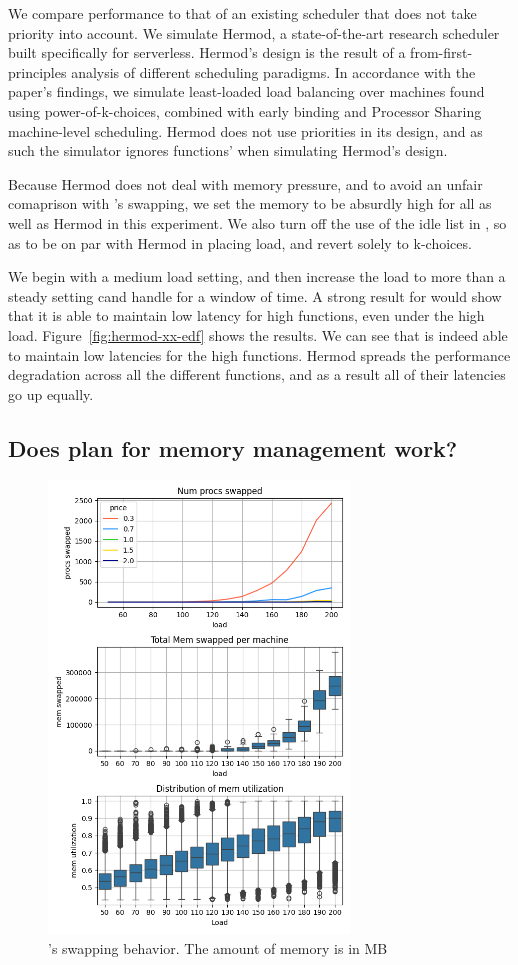 We compare \sys{} performance to that of an existing scheduler that does not
take priority into account. We simulate Hermod\cite{hermod}, a state-of-the-art
research scheduler built specifically for serverless. Hermod's design is the
result of a from-first-principles analysis of different scheduling paradigms. In
accordance with the paper's findings, we simulate least-loaded load balancing
over machines found using power-of-k-choices, combined with early binding and
Processor Sharing machine-level scheduling. Hermod does not use priorities in
its design, and as such the simulator ignores functions' \class{} when
simulating Hermod's design.

Because Hermod does not deal with memory pressure, and to avoid an unfair
comaprison with \sys{}'s swapping, we set the memory to be absurdly high for all
\sys{} as well as Hermod in this experiment. We also turn off the use of the
idle list in \sys{}, so as to be on par with Hermod in placing load, and revert
solely to k-choices.

We begin with a medium load setting, and then increase the load to more than a
steady setting cand handle for a window of time. A strong result for \sys{}
would show that it is able to maintain low latency for high \priceclass{}
functions, even under the high load. Figure~\ref{fig:hermod-xx-edf} shows the
results. We can see that \sys{} is indeed able to maintain low latencies for the
high \class{} functions. Hermod spreads the performance degradation across all
the different functions, and as a result all of their latencies go up equally.


\subsection{Does \sys{} plan for memory management work?}

\begin{figure}[t!]
    \centering
      \includegraphics[width=8cm]{img/memory_graphs.png}
      \caption{ \sys{}'s swapping behavior. The amount of memory is in MB  }
    \label{fig:memory-graphs}
\end{figure}

